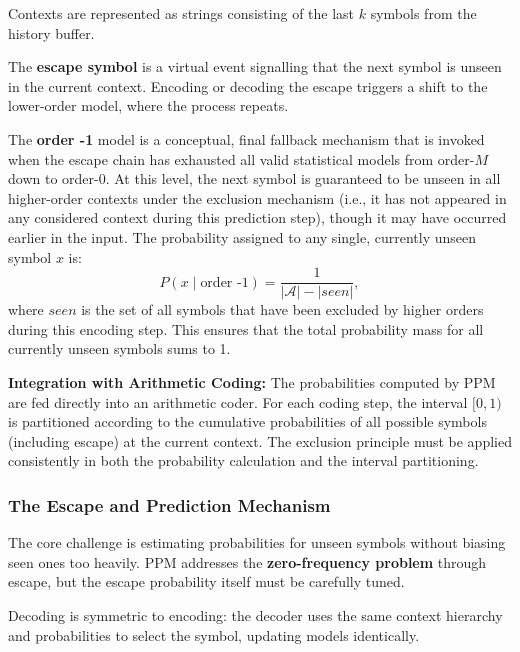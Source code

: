 Contexts are represented as strings consisting of the last $k$ symbols from the
history buffer.

\begin{definitionbox}
The \textbf{escape symbol} is a virtual event signalling that the next symbol is
unseen in the current context. Encoding or decoding the escape triggers a shift to
the lower-order model, where the process repeats.
\end{definitionbox}

\begin{definitionbox}[Order -1]
The \textbf{order -1} model is a conceptual, final fallback mechanism that is invoked when the escape chain has exhausted all valid statistical models from order-$M$ down to order-0. At this level, the next symbol is guaranteed to be unseen in all higher-order contexts under the exclusion mechanism (i.e., it has not appeared in any considered context during this prediction step), though it may have occurred earlier in the input. The probability assigned to any single, currently unseen symbol $x$ is:
\[
    P(x \mid \text{order -1}) = \frac{1}{|\mathcal{A}| - |seen|},
\]
where $seen$ is the set of all symbols that have been excluded by higher orders during this encoding step. This ensures that the total probability mass for all currently unseen symbols sums to 1.
\end{definitionbox}

\begin{importantbox}
\textbf{Integration with Arithmetic Coding:}
The probabilities computed by PPM are fed directly into an arithmetic coder. 
For each coding step, the interval $[0,1)$ is partitioned according to the 
cumulative probabilities of all possible symbols (including escape) at the 
current context. The exclusion principle must be applied consistently in both 
the probability calculation and the interval partitioning.
\end{importantbox}

\subsubsection{The Escape and Prediction Mechanism}

The core challenge is estimating probabilities for unseen symbols without biasing
seen ones too heavily. PPM addresses the \textbf{zero-frequency problem} through
escape, but the escape probability itself must be carefully tuned.

Decoding is symmetric to encoding: the decoder uses the same context hierarchy and
probabilities to select the symbol, updating models identically.

